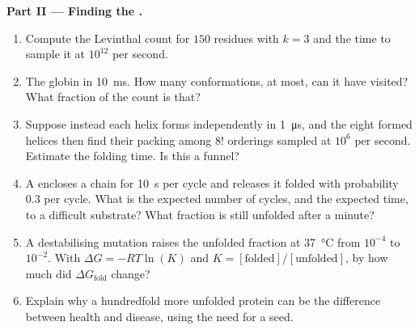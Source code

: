 \begin{problem}
\medskip
\noindent\textbf{Part II --- Finding the .}
\begin{enumerate}[resume]
  \item Compute the Levinthal count for $150$ residues with $k = 3$
        and the time to sample it at $10^{12}$ per second.
  \item The globin  in \qty{10}{ms}. How many conformations, at
        most, can it have visited? What fraction of the count is that?
  \item Suppose instead each helix forms independently in
        \qty{1}{\micro s}, and the eight formed helices then find their
        packing among $8!$ orderings sampled at $10^{6}$ per second.
        Estimate the folding time. Is this a funnel?
  \item A  encloses a chain for \qty{10}{s} per cycle and
        releases it folded with probability $0.3$ per cycle. What is
        the expected number of cycles, and the expected time, to  a
        difficult substrate? What fraction is still unfolded after a
        minute?
  \item A destabilising mutation raises the unfolded fraction at
        \qty{37}{\celsius} from $10^{-4}$ to $10^{-2}$. With $\Delta G =
        -RT\ln(K)$ and $K = [\text{folded}]/[\text{unfolded}]$, by how
        much did $\Delta G_{\text{fold}}$ change?
  \item Explain why a hundredfold more unfolded protein can be the
        difference between health and  disease, using the
        need for a seed.
\end{enumerate}


\end{problem}
